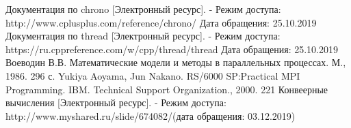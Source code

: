 %
%

\begin{thebibliography}{}
     Документация по chrono [Электронный ресурс]. -
    Режим доступа: http://www.cplusplus.com/reference/chrono/
    Дата обращения: 25.10.2019
     Документация по thread [Электронный ресурс]. -
    Режим доступа: https://ru.cppreference.com/w/cpp/thread/thread
    Дата обращения: 25.10.2019
     Воеводин В.В. Математические модели и методы в параллельных процессах. М., 1986. 296 с.
     Yukiya Aoyama, Jun Nakano. RS/6000 SP:Practical MPI Programming. IBM. Technical Support Organization., 2000. 221
     Конвеерные вычисления [Электронный ресурс]. - Режим доступа: http://www.myshared.ru/slide/674082/(дата обращения: 03.12.2019)
\end{thebibliography}

